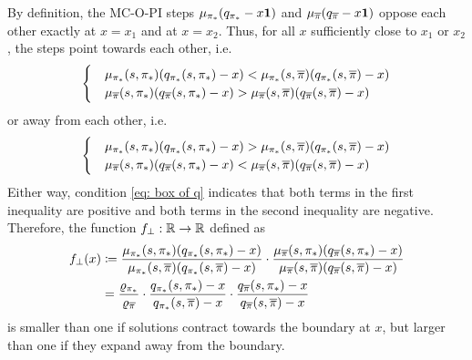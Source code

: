 By definition, the MC-O-PI steps $\mu_{{\pi}_*}(q_{{\pi}_*} - x \mathbf{1})$ and $\mu_{\overline{\pi}}(q_{\overline{\pi}} - x \mathbf{1})$ oppose each other exactly at $x = x_1$ and at $x = x_2$.
Thus, for all $x$ sufficiently close to $x_1$ or $x_2$, the steps point towards each other, i.e.
\begin{align}
\label{eq: contract to boundary}
   \begin{cases}
       &\mu_{{\pi}_*}(s, {\pi}_*)(q_{{\pi}_*}(s, {\pi}_*) - x)
       <
       \mu_{{\pi}_*}(s, \overline{\pi})(q_{{\pi}_*}(s, \overline{\pi}) - x)
       \\
       &\mu_{\overline{\pi}}(s, {\pi}_*)(q_{\overline{\pi}}(s, {\pi}_*) - x)
       >
       \mu_{\overline{\pi}}(s, \overline{\pi})(q_{\overline{\pi}}(s, \overline{\pi}) - x)
   \end{cases}
\end{align}
or away from each other, i.e.
\begin{align}
\label{eq: away from boundary}
   \begin{cases}
       &\mu_{{\pi}_*}(s, {\pi}_*)(q_{{\pi}_*}(s, {\pi}_*) - x)
       >
       \mu_{{\pi}_*}(s, \overline{\pi})(q_{{\pi}_*}(s, \overline{\pi}) - x)
       \\
       &\mu_{\overline{\pi}}(s, {\pi}_*)(q_{\overline{\pi}}(s, {\pi}_*) - x)
       <
       \mu_{\overline{\pi}}(s, \overline{\pi})(q_{\overline{\pi}}(s, \overline{\pi}) - x)
   \end{cases}
\end{align}
Either way, condition \eqref{eq: box of q} indicates that both terms in the first inequality are positive and both terms in the second inequality are negative.
Therefore, the function $f_\perp : \mathbb{R} \to \mathbb{R}$ defined as 
\begin{align}
\nonumber
    f_\perp(x) 
    &\coloneqq
    \dfrac{\mu_{{\pi}_*}(s, {\pi}_*)(q_{{\pi}_*}(s, {\pi}_*) - x)}{\mu_{{\pi}_*}(s, \overline{\pi})(q_{{\pi}_*}(s, \overline{\pi}) - x)}
    \cdot
    \dfrac{\mu_{\overline{\pi}}(s, {\pi}_*)(q_{\overline{\pi}}(s, {\pi}_*) - x)}{\mu_{\overline{\pi}}(s, \overline{\pi})(q_{\overline{\pi}}(s, \overline{\pi}) - x)}
    \\
    \label{eq: f perp}
    &=
    \dfrac{\varrho_{{\pi}_*}}{\varrho_{\overline{\pi}}}
    \cdot
    \dfrac{q_{{\pi}_*}(s, {\pi}_*) - x}{q_{{\pi}_*}(s, \overline{\pi}) - x}
    \cdot
    \dfrac{q_{\overline{\pi}}(s, {\pi}_*) - x}{q_{\overline{\pi}}(s, \overline{\pi}) - x}
\end{align}
is smaller than one if solutions contract towards the boundary at $x$,
but larger than one if they expand away from the boundary.

